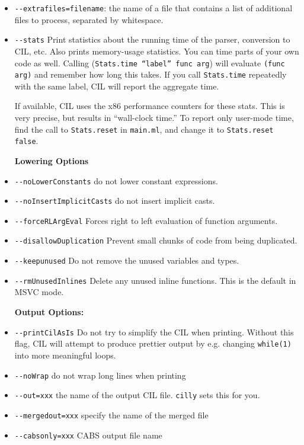 \documentclass{article}
\def\t#1{{\tt #1}}
\begin{document}
\begin{itemize}
  \item \t{-{}-extrafiles=filename}: the name of a file that contains
    a list of additional files to process, separated by whitespace.
  \item \t{-{}-stats} Print statistics about the running time of the
    parser, conversion to CIL, etc.  Also prints memory-usage
    statistics.  You can time parts of your own code as well.  Calling
    (\t{Stats.time ``label'' func arg}) will evaluate \t{(func arg)}
    and remember how long this takes.  If you call \t{Stats.time}
    repeatedly with the same label, CIL will report the aggregate
    time.

    If available, CIL uses the x86 performance counters for these
    stats.  This is very precise, but results in ``wall-clock time.''
    To report only user-mode time, find the call to \t{Stats.reset} in
    \t{main.ml}, and change it to \t{Stats.reset false}.
  
   {\bf Lowering Options}
  \item \t{-{}-noLowerConstants} do not lower constant expressions.
  \item \t{-{}-noInsertImplicitCasts} do not insert implicit casts.
  \item \t{-{}-forceRLArgEval} Forces right to left evaluation of function arguments.
  \item \t{-{}-disallowDuplication} Prevent small chunks of code from being duplicated.
  \item \t{-{}-keepunused} Do not remove the unused variables and types.
  \item \t{-{}-rmUnusedInlines} Delete any unused inline functions.  This is the default in MSVC mode.
   
  {\bf Output Options:}
  \item \t{-{}-printCilAsIs} Do not try to simplify the CIL when
  printing.  Without this flag, CIL will attempt to produce prettier
  output by e.g. changing \t{while(1)} into more meaningful loops.
  \item \t{-{}-noWrap} do not wrap long lines when printing
  \item \t{-{}-out=xxx} the name of the output CIL file.  \t{cilly}
  sets this for you.
  \item \t{-{}-mergedout=xxx} specify the name of the merged file
  \item \t{-{}-cabsonly=xxx} CABS output file name


\end{itemize}
\end{document}
